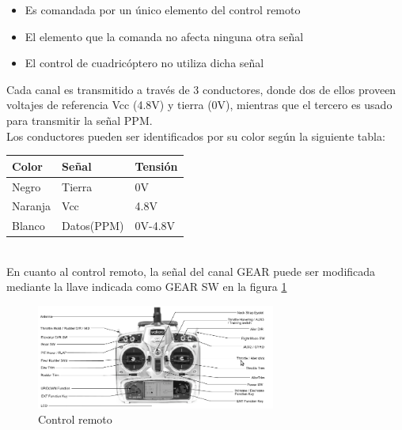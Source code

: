 \documentclass[main]{subfiles}
\begin{document}
\begin{itemize}
\item Es comandada por un único elemento del control remoto
\item El elemento que la comanda no afecta ninguna otra señal
\item El control de cuadricóptero no utiliza dicha señal
\end{itemize}

Cada canal es transmitido a través de 3 conductores, donde dos de ellos proveen voltajes de referencia Vcc (4.8V) y tierra (0V), mientras que el tercero es usado para transmitir la señal PPM.\\


Los conductores pueden ser identificados por su color según la siguiente tabla:\\

\begin{tabular}{|l|l|l|}
\hline
Color 		& Señal			&Tensión	\\
\hline
Negro		& Tierra		& 0V		\\
\hline
Naranja 	& Vcc			& 4.8V 		\\
\hline
Blanco 		& Datos(PPM) 	& 0V-4.8V 	\\
\hline
\end{tabular}
\\

En cuanto al control remoto, la señal del canal GEAR puede ser modificada mediante la llave indicada como GEAR SW en la figura \ref{fig:control}

\begin{figure}[H]
\begin{center}
\includegraphics[width=0.7\textwidth]{./pics_switcheo/control.png}
\caption{Control remoto}
\label{fig:control}
\end{center}
\end{figure}
\end{document}
